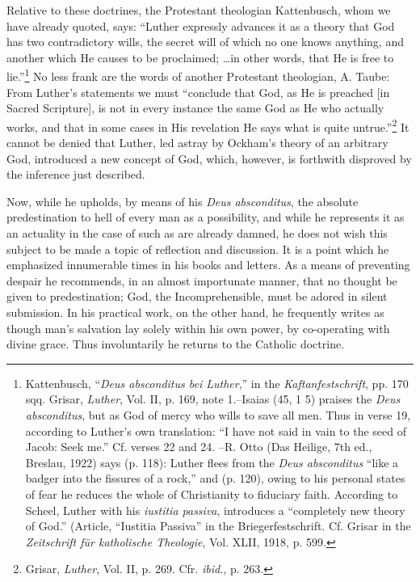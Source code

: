 Relative to these doctrines, the Protestant theologian Kattenbusch, whom
we have already quoted, says: “Luther expressly advances it as a theory that
God has two contradictory wills, the secret will of which no one knows anything,
and another which He causes to be proclaimed; \dots in other words,
that He is free to lie.”\footnote
{Kattenbusch, “\textit{Deus absconditus bei Luther},” in the \textit{Kaftanfestschrift}, pp. 170 sqq.
Grisar, \textit{Luther}, Vol. II, p. 169, note 1.--Isaias (45, 1 5) praises the \textit{Deus absconditus}, but as
God of mercy who wills to save all men. Thus in verse 19, according to Luther’s own
translation: “I have not said in vain to the seed of Jacob: Seek me.” Cf. verses 22 and 24.
--R. Otto (Das Heilige, 7th ed., Breslau, 1922) says (p. 118): Luther flees from the \textit{Deus
absconditus} “like a badger into the fissures of a rock,” and (p. 120), owing to his personal
states of fear he reduces the whole of Christianity to fiduciary faith. According to Scheel,
Luther with his \textit{iustitia passiva}, introduces a “completely new theory of God.” (Article,
“Iustitia Passiva” in the Briegerfestschrift. Cf. Grisar in the \textit{Zeitschrift für katholische
Theologie}, Vol. XLII, 1918, p. 599.}
No less frank are the words of another Protestant
theologian, A. Taube: From Luther’s statements we must “conclude that God,
as He is preached [in Sacred Scripture], is not in every instance the same
God as He who actually works, and that in some cases in His revelation He
says what is quite untrue.”\footnote{Grisar, \textit{Luther}, Vol. II, p. 269. Cfr. \textit{ibid.}, p. 263.}
It cannot be denied that Luther, led astray by
Ockham’s theory of an arbitrary God, introduced a new concept of God,
which, however, is forthwith disproved by the inference just described.

Now, while he upholds, by means of his \textit{Deus absconditus}, the absolute
predestination to hell of every man as a possibility, and while he represents it
as an actuality in the case of such as are already damned, he does not wish
this subject to be made a topic of reflection and discussion. It is a point which
he emphasized innumerable times in his books and letters. As a means
of preventing despair he recommends, in an almost importunate manner, that no
thought be given to predestination; God, the Incomprehensible, must be
adored in silent submission. In his practical work, on the other hand, he frequently writes as though man’s salvation lay solely within his own power, by
co-operating with divine grace. Thus involuntarily he returns to the Catholic
doctrine.

